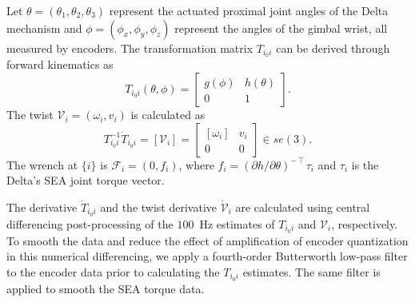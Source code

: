 \documentclass[letterpaper, 10 pt, journal, twoside]{IEEEtran}
\newcommand{\real}{\mathbb{R}}
\newcommand{\wrench}{{\mathcal F}}
\newcommand{\twist}{{\mathcal V}}
\begin{document}
Let $\theta = (\theta_1, \theta_2, \theta_3)$ represent the actuated proximal joint angles of the Delta mechanism and $\phi = (\phi_x, \phi_y, \phi_z)$ represent the angles of the gimbal wrist, all measured by encoders. The transformation matrix $T_{i_0 i}$ can be derived through forward kinematics as
\begin{equation}
    T_{i_0 i}(\theta,\phi) = \begin{bmatrix}
                    g(\phi) & h(\theta) \\
                    0 & 1
                \end{bmatrix}
.\end{equation}
The twist $\twist_i = (\omega_i,v_i)$ is calculated as
\begin{equation}
    T_{i_0i}^{-1} \dot{T}_{i_0i}  = [\twist_i] = 
    \begin{bmatrix}
        [\omega_i] & v_i \\
        0 & 0
    \end{bmatrix} \in se(3).
\end{equation}
The wrench at $\{i\}$ is $\wrench_i = (0, f_i)$, where $f_i = (\partial h/\partial \theta)^{-\intercal} \tau_i$ and $\tau_i$ is the Delta's SEA joint torque vector. 

The derivative $\dot{T}_{i_0i}$ and the twist derivative $\dot{\twist}_i$ are calculated using central differencing post-processing of the $100$~Hz estimates of $T_{i_0i}$ and $\twist_i$, respectively. To smooth the data and reduce the effect of amplification of encoder quantization in this numerical differencing, we apply a fourth-order Butterworth low-pass filter to the encoder data prior to calculating the $T_{i_0i}$ estimates. The same filter is applied to smooth the SEA torque data. 


\begin{comment}
Let $\theta\in\real^3$ represent the proximal joint angles of the delta mechanism as measured by the encoders. The delta's forward kinematics yields
\begin{equation}
    T_{\text{base,delta}} = f(\theta)
.\end{equation}
Let $\phi \in \real^3$ be the gimbal joint angles, with forward kinematics
\begin{equation}
    T_{\text{delta,gimbal}} = g(\phi)
.\end{equation}

Combining three transformation matrices, we can construct $T_{i_0 i}$ as:
\begin{equation}
    T_{\text{gimbal0,gimbal}} = T_{\text{base,gimbal0}}^{-1} T_{\text{base,delta}} T_{\text{delta,gimbal}}, \end{equation}
\end{comment}
\end{document}
